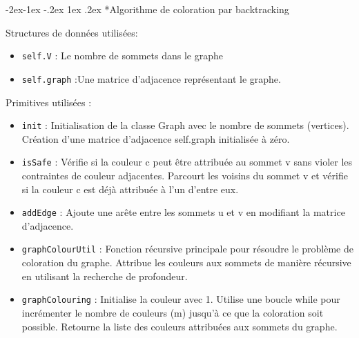 \documentclass{report}
\makeatletter
\renewcommand\subsection{\@startsection{subsection}{2}{\z@}%
  {-2ex\@plus -1ex \@minus -.2ex}%
  {1ex \@plus .2ex}%
  {\normalfont\bfseries}}
\makeatother
\begin{document}
\subsection*{Algorithme de coloration par backtracking }

Structures de données utilisées:
\begin{itemize}
  \item \texttt{self.V} : Le nombre de sommets dans le graphe
 \item \texttt{self.graph} :Une matrice d'adjacence représentant le graphe.
\end{itemize}

\hspace{-4em}Primitives utilisées :
\begin{itemize}
    \item \texttt{init} :     Initialisation de la classe Graph avec le nombre de sommets (vertices).
    Création d'une matrice d'adjacence self.graph initialisée à zéro.
  \item \texttt{isSafe} :     Vérifie si la couleur c peut être attribuée au sommet v sans violer les contraintes de couleur adjacentes.
    Parcourt les voisins du sommet v et vérifie si la couleur c est déjà attribuée à l'un d'entre eux.

  \item \texttt{addEdge} : Ajoute une arête entre les sommets u et v en modifiant la matrice d'adjacence.
  \item \texttt{graphColourUtil} :     Fonction récursive principale pour résoudre le problème de coloration du graphe.
    Attribue les couleurs aux sommets de manière récursive en utilisant la recherche de profondeur.
  \item \texttt{graphColouring} :     Initialise la couleur avec 1.
    Utilise une boucle while pour incrémenter le nombre de couleurs (m) jusqu'à ce que la coloration soit possible.
    Retourne la liste des couleurs attribuées aux sommets du graphe.
\end{itemize}
\end{document}
